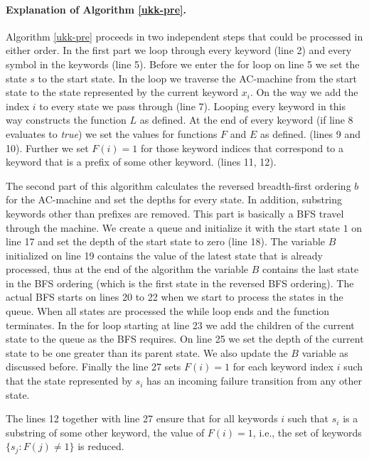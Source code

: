 \documentclass[english,twoside,censored,csm,algorithms-track-2020]{HYthesisML}
\theoremstyle{plain}
\theoremstyle{definition}
\begin{document}
\paragraph{Explanation of Algorithm \ref{ukk-pre}.}  
Algorithm \ref{ukk-pre} proceeds in two independent steps that could be processed in either order.
In the first part we loop through every keyword (line 2) and every symbol in the keywords (line 5).
Before we enter the for loop on line 5 we set the state $s$ to the start state. In the loop
we traverse the AC-machine from the start state to the state represented by the current keyword $x_i$.
On the way we add the index $i$ to every state we pass through (line 7). Looping every keyword in this
way constructs the function $L$ as defined. At the end of every keyword (if line 8 evaluates to
\textit{true}) we set the values for functions $F$ and $E$ as defined. (lines 9 and 10).
Further we set $F(i) = 1$ for those keyword indices that correspond to a keyword that is a prefix
of some other keyword. (lines 11, 12).

The second part of this algorithm calculates the reversed breadth-first ordering $b$ for the
AC-machine and set the depths for every state. In addition, substring keywords other than
prefixes are removed. This part is basically a BFS travel through the machine. We create a queue
and initialize it with the start state $1$ on line 17 and set the depth of the start state to
zero (line 18). The variable $B$ initialized on line 19 contains the value of the latest state
that is already processed, thus at the end of the algorithm the variable $B$ contains the last state
in the BFS ordering (which is the first state in the reversed BFS ordering). The actual BFS starts
on lines 20 to 22 when we start to process the states in the queue. When all states are processed
the while loop ends and the function terminates. In the for loop starting at line 23 we add the
children of the current state to the queue as the BFS requires. On line 25 we set the depth
of the current state to be one greater than its parent state. We also update the $B$ variable
as discussed before. Finally the line 27 sets $F(i) = 1$ for each keyword index $i$ such that
the state represented by $s_i$ has an incoming failure transition from any other state.

The lines 12 together with line 27 ensure that for all keywords $i$ such that $s_i$ is a substring
of some other keyword, the value of $F(i)=1$, i.e., the set of keywords $\{s_j : F(j) \neq 1\}$ is
reduced.
\end{document}
